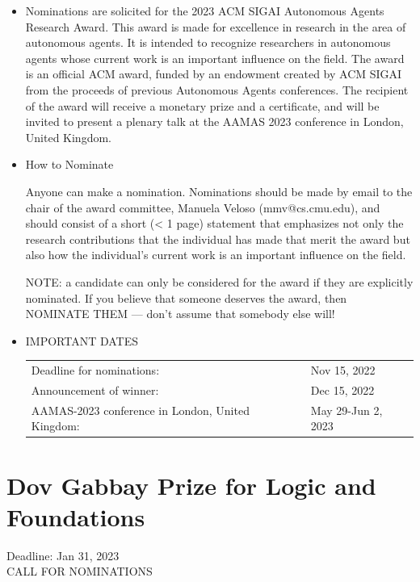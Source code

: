 \documentclass[prodmode,acmtecs]{acmsmall} %
\begin{document}
\begin{itemize}\item   Nominations are solicited for the 2023 ACM SIGAI Autonomous Agents Research Award. This award is made for excellence in research in the area of autonomous agents. It is intended to recognize researchers in autonomous agents whose current work is an important influence on the field. The award is an official ACM award, funded by an endowment created by ACM SIGAI from the proceeds of previous Autonomous Agents conferences. The recipient of the award will receive a monetary prize and a certificate, and will be invited to present a plenary talk at the AAMAS 2023 conference in London, United Kingdom. 
 
\item  How to Nominate 
 
  Anyone can make a nomination. Nominations should be made by email to the chair of the award committee, Manuela Veloso (mmv@cs.cmu.edu), and should consist of a short (< 1 page) statement that emphasizes not only the research contributions that the individual has made that merit the award but also how the individual’s current work is an important influence on the field. 
 
  NOTE: a candidate can only be considered for the award if they are explicitly nominated. If you believe that someone deserves the award, then NOMINATE THEM — don’t assume that somebody else will! 
 
\item  IMPORTANT DATES 
 
\begin{tabulary}{\linewidth}{LL}Deadline for nominations:  & Nov 15, 2022 \\
Announcement of winner:  & Dec 15, 2022 \\
AAMAS-2023 conference in London, United Kingdom:  & May 29-Jun 2, 2023 \\
\end{tabulary}
 
\end{itemize}\section{Dov Gabbay Prize for Logic and Foundations}\label{DovGabbayPrizeforLogicandFoundations}  Deadline: Jan 31, 2023\\ 
CALL FOR NOMINATIONS 
\end{document}
